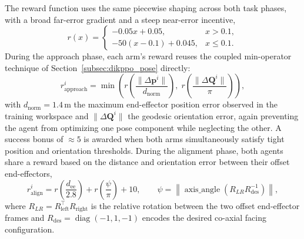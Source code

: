 The reward function uses the same piecewise shaping across both task phases, with a broad far-error
gradient and a steep near-error incentive,
\begin{equation}
r(x) =
\begin{cases}
-0.05 x + 0.05, & x > 0.1, \\
-50(x - 0.1) + 0.045, & x \leq 0.1.
\end{cases}
\label{eq:alpha_piecewise}
\end{equation}
During the approach phase, each arm's reward reuses the coupled min-operator technique of
Section~\ref{subsec:dikppo_pose} directly:
\begin{equation}
r_{\text{approach}}^i = \min\!\left( r\!\left( \frac{\lVert \Delta \mathbf{p}^i \rVert}{d_{\text{norm}}} \right),\;
r\!\left( \frac{\lVert \Delta \mathbf{Q}^i \rVert}{\pi} \right) \right),
\label{eq:alpha_approach}
\end{equation}
with $d_{\text{norm}} = 1.4$\,m the maximum end-effector position error observed in the training
workspace and $\lVert \Delta \mathbf{Q}^i \rVert$ the geodesic orientation error, again preventing
the agent from optimizing one pose component while neglecting the other. A success bonus of
$\approx 5$ is awarded when both arms simultaneously satisfy tight position and orientation
thresholds. During the alignment phase, both agents share a reward based on the distance and
orientation error between their offset end-effectors,
\begin{equation}
r_{\text{align}}^i = r\!\left( \frac{d_{\text{ee}}}{2.8} \right) + r\!\left( \frac{\psi}{\pi} \right) + 10,
\qquad \psi = \left\lVert \operatorname{axis\_angle}\!\left( R_{LR} R_{\text{des}}^{-1} \right) \right\rVert,
\label{eq:alpha_align}
\end{equation}
where $R_{LR} = R_{\text{left}}^\top R_{\text{right}}$ is the relative rotation between the two
offset end-effector frames and $R_{\text{des}} = \operatorname{diag}(-1, 1, -1)$ encodes the desired
co-axial facing configuration.

